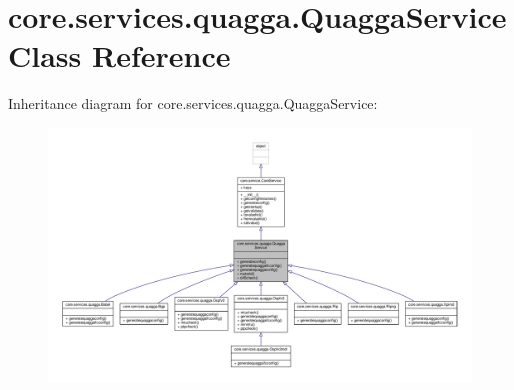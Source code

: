 \hypertarget{classcore_1_1services_1_1quagga_1_1_quagga_service}{\section{core.\+services.\+quagga.\+Quagga\+Service Class Reference}
\label{classcore_1_1services_1_1quagga_1_1_quagga_service}
}


Inheritance diagram for core.\+services.\+quagga.\+Quagga\+Service\+:
\nopagebreak
\begin{figure}[H]
\begin{center}
\leavevmode
\includegraphics[width=350pt]{classcore_1_1services_1_1quagga_1_1_quagga_service__inherit__graph}
\end{center}
\end{figure}


